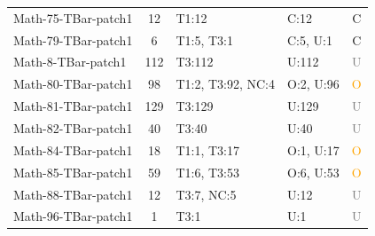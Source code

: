 \begin{longtable}{l|c|l|l|c}
Math-75-TBar-patch1 & 12 & T1:12 & C:12 & \textcolor{green!60!black}{C} \\
Math-79-TBar-patch1 & 6 & T1:5, T3:1 & C:5, U:1 & \textcolor{green!60!black}{C} \\
Math-8-TBar-patch1 & 112 & T3:112 & U:112 & \textcolor{gray}{U} \\
Math-80-TBar-patch1 & 98 & T1:2, T3:92, NC:4 & O:2, U:96 & \textcolor{orange}{O} \\
Math-81-TBar-patch1 & 129 & T3:129 & U:129 & \textcolor{gray}{U} \\
Math-82-TBar-patch1 & 40 & T3:40 & U:40 & \textcolor{gray}{U} \\
Math-84-TBar-patch1 & 18 & T1:1, T3:17 & O:1, U:17 & \textcolor{orange}{O} \\
Math-85-TBar-patch1 & 59 & T1:6, T3:53 & O:6, U:53 & \textcolor{orange}{O} \\
Math-88-TBar-patch1 & 12 & T3:7, NC:5 & U:12 & \textcolor{gray}{U} \\
Math-96-TBar-patch1 & 1 & T3:1 & U:1 & \textcolor{gray}{U} \\

\end{longtable}
